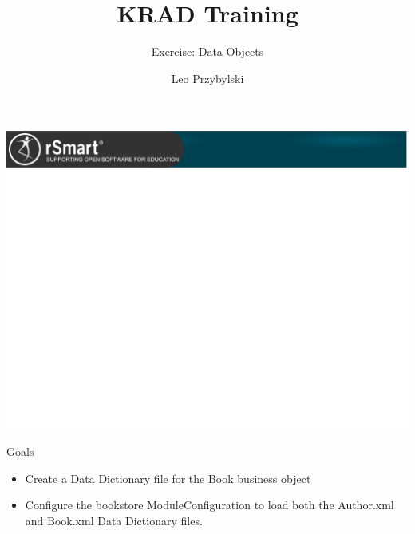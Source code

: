 \documentclass[xcolor=dvipsnames,14pt,professionalfonts]{beamer}
\begin{document}
\title{KRAD Training}
\subtitle{Exercise: Data Objects}
\author[Leo]{Leo Przybylski}

\usebackgroundtemplate%
{%
    \includegraphics[width=\paperwidth,height=\paperheight]{../img/header.png}%
}

{
%
\begin{frame}[plain]
  \titlepage
\end{frame}
}

\begin{frame}{Goals}
  \begin{itemize}
  \item Create a Data Dictionary file for the Book business object
  \item Configure the bookstore ModuleConfiguration to load both the Author.xml and Book.xml Data Dictionary files.
  \end{itemize}
\end{frame}
\end{document}
